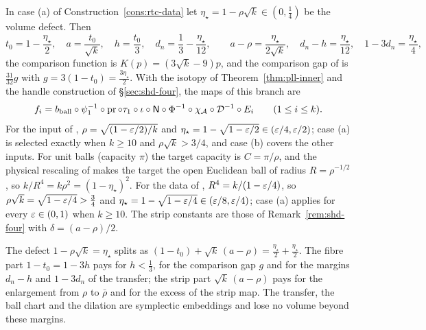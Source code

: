 \begin{remark}\label{rem:rtc-equal}\label{rem:cub-lean}
In case (a) of Construction~\ref{cons:rtc-data} let $\eta_\star=1-\rho\sqrt k\in(0,\frac14)$ be the volume defect. Then
\[
 t_0=1-\frac{\eta_\star}2,\quad a=\frac{t_0}{\sqrt k},\quad h=\frac{t_0}3,\quad d_n=\frac13-\frac{\eta_\star}{12},\qquad
 a-\rho=\frac{\eta_\star}{2\sqrt k},\quad d_n-h=\frac{\eta_\star}{12},\quad 1-3d_n=\frac{\eta_\star}4,
\]
the comparison function is $K(p)=(3\sqrt k-9)p$, and the comparison gap of  is
$\frac{31}{32}g$ with $g=3(1-t_0)=\frac{3\eta_\star}2$. With the isotopy of Theorem~\ref{thm:pll-inner} and the handle
construction of \S\ref{sec:shd-four}, the maps of this branch are
\[
 f_i= b_{\rm ball}\circ\psi_1^{-1}\circ\operatorname{pr}\circ\tau_1\circ\iota
       \circ\mathsf N\circ\Phi^{-1}\circ\chi_{\mathcal A}\circ\mathcal D^{-1}\circ E_i\qquad(1\le i\le k).
\]
For the input of , $\rho=\sqrt{(1-\varepsilon/2)/k}$ and
$\eta_\star=1-\sqrt{1-\varepsilon/2}\in(\varepsilon/4,\varepsilon/2)$; case (a) is selected exactly when $k\ge10$ and $\rho\sqrt k>3/4$,
and case (b) covers the other inputs. For unit balls (capacity $\pi$) the target capacity is $C=\pi/\rho$, and the
physical rescaling of  makes the target the open Euclidean ball of radius
$R=\rho^{-1/2}$, so $k/R^4=k\rho^2=(1-\eta_\star)^2$. For the data of , $R^4=k/(1-\varepsilon/4)$, so
$\rho\sqrt k=\sqrt{1-\varepsilon/4}>\frac34$ and $\eta_\star=1-\sqrt{1-\varepsilon/4}\in(\varepsilon/8,\varepsilon/4)$; case (a) applies for every
$\varepsilon\in(0,1)$ when $k\ge10$. The strip constants are those of Remark~\ref{rem:shd-four} with
$\delta=(a-\rho)/2$.

The defect $1-\rho\sqrt k=\eta_\star$ splits as $(1-t_0)+\sqrt k\,(a-\rho)=\frac{\eta_\star}2+\frac{\eta_\star}2$. The fibre part $1-t_0=1-3h$ pays for
$h<\frac13$, for the comparison gap $g$ and for the margins $d_n-h$ and $1-3d_n$ of the transfer; the strip part $\sqrt k\,(a-\rho)$ pays for the enlargement from $\rho$ to $\bar\rho$ and for the excess of the strip map.
The transfer, the ball chart and the dilation are symplectic embeddings and lose no volume beyond these margins.
\end{remark}

